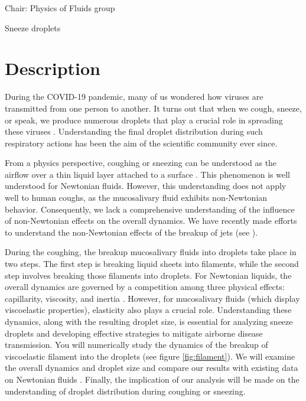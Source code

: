 \documentclass[a4paper,10pt]{article}
\begin{document}
\noindent Chair: Physics of Fluids group
\begin{center}
 \begin{LARGE}
 Sneeze droplets
   \end{LARGE}
\end{center}
\section*{Description}

During the COVID-19 pandemic, many of us wondered how viruses are transmitted from one person to another. It turns out that when we cough, sneeze, or speak, we produce numerous droplets that play a crucial role in spreading these viruses \citep{bourouiba2021fluid}. Understanding the final droplet distribution during such respiratory actions has been the aim of the scientific community ever since. 

From a physics perspective, coughing or sneezing can be understood as the airflow over a thin liquid layer attached to a surface \citep{kant2023bag}. This phenomenon is well understood for Newtonian fluids. However, this understanding does not apply well to human coughs, as the mucosalivary fluid exhibits non-Newtonian behavior. Consequently, we lack a comprehensive understanding of the influence of non-Newtonian effects on the overall dynamics. We have recently made efforts to understand the non-Newtonian effects of the breakup of jets (see \citet{dixit2024viscoelastic}).   

During the coughing, the breakup mucosalivary fluids into droplets take place in two steps. The first step is breaking liquid sheets into filaments, while the second step involves breaking those filaments into droplets. For Newtonian liquids, the overall dynamics are governed by a competition among three physical effects: capillarity, viscosity, and inertia \citep{anthony2019dynamics}. However, for mucosalivary fluids (which display viscoelastic properties),  elasticity also plays a crucial role\citep{sen2021retraction, liu2022contraction}. Understanding these dynamics, along with the resulting droplet size, is essential for analyzing sneeze droplets and developing effective strategies to mitigate airborne disease transmission.
You will numerically study the dynamics of the breakup of viscoelastic filament into the droplets (see figure \ref{fig:filament}). We will examine the overall dynamics and droplet size and compare our results with existing data on Newtonian fluids \citep{anthony2019dynamics}. Finally, the implication of our analysis will be made on the understanding of droplet distribution during coughing or sneezing. 
\end{document}
